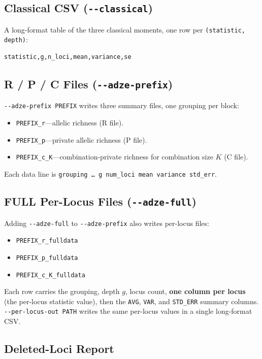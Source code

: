 \documentclass[11pt]{article}
\begin{document}
\subsection{Classical CSV (\texttt{-{}-classical})}
\label{sec:classicalcsv}

A long-format table of the three classical moments, one row per
\texttt{(statistic, depth)}:
\begin{lstlisting}[style=out]
statistic,g,n_loci,mean,variance,se
\end{lstlisting}

\subsection{R / P / C Files (\texttt{-{}-adze-prefix})}
\label{sec:rpc}

\texttt{-{}-adze-prefix PREFIX} writes three summary files, one grouping per
block:
\begin{itemize}
  \item \texttt{PREFIX\_r}---allelic richness (R file).
  \item \texttt{PREFIX\_p}---private allelic richness (P file).
  \item \texttt{PREFIX\_c\_K}---combination-private richness for combination
        size \(K\) (C file).
\end{itemize}
Each data line is \texttt{grouping \ldots{} g num\_loci mean variance std\_err}.

\subsection{FULL Per-Locus Files (\texttt{-{}-adze-full})}
\label{sec:full}

Adding \texttt{-{}-adze-full} to \texttt{-{}-adze-prefix} also writes per-locus
files:
\begin{itemize}
  \item \texttt{PREFIX\_r\_fulldata}
  \item \texttt{PREFIX\_p\_fulldata}
  \item \texttt{PREFIX\_c\_K\_fulldata}
\end{itemize}
Each row carries the grouping, depth \(g\), locus count, \textbf{one column per
locus} (the per-locus statistic value), then the \texttt{AVG}, \texttt{VAR}, and
\texttt{STD\_ERR} summary columns. \texttt{-{}-per-locus-out PATH} writes the
same per-locus values in a single long-format CSV.

\subsection{Deleted-Loci Report}
\label{sec:deleted}
\end{document}
